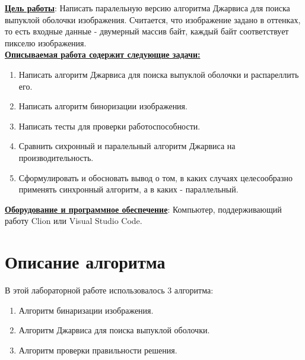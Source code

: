 \documentclass[a4paper, 12pt]{article}
\begin{document}
\underline{\textbf{Цель работы}}: Написать паралельную версию алгоритма Джарвиса для поиска выпуклой оболочки изображения. Считается, что изображение задано в оттенках, то есть входные данные - двумерный массив байт, каждый байт соответствует пикселю изображения.\\[2mm]


\underline{\textbf{Описываемая работа содержит следующие задачи:}}\\[1mm]

\begin{enumerate}
  \item Написать алгоритм Джарвиса для поиска выпуклой оболочки и распареллить его.
  \item Написать алгоритм биноризации изображения.
  \item Написать тесты для проверки работоспособности.
  \item Сравнить сихронный и паралельный алгоритм Джарвиса на производительность.
  \item Сформулировать и обосновать вывод о том, в каких случаях целесообразно применять синхронный алгоритм, а в каких - параллельный.
\end{enumerate}







\underline{\textbf{Оборудование и программное обеспечение}}: Компьютер, поддерживающий работу Clion или Visual Studio Code.

\newpage
\section{Описание алгоритма}

В этой лабораторной работе использовалось 3 алгоритма:\\[2mm]

\begin{enumerate}
  \item Алгоритм бинаризации изображения.
  \item Алгоритм Джарвиса для поиска выпуклой оболочки.
  \item Алгоритм проверки правильности решения.
\end{enumerate}
\end{document}
